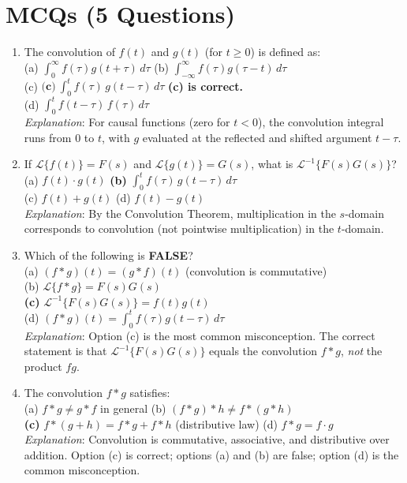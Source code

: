 \documentclass[12pt,a4paper]{article}
\begin{document}
\section{MCQs (5 Questions)}

\begin{enumerate}[label=\textbf{MCQ \arabic*.}, leftmargin=*, itemsep=12pt]

\item The convolution of $f(t)$ and $g(t)$ (for $t\ge 0$) is defined as:\\
(a) $\displaystyle\int_0^\infty f(\tau)g(t+\tau)\,d\tau$ \qquad
(b) $\displaystyle\int_{-\infty}^\infty f(\tau)g(\tau-t)\,d\tau$\\[4pt]
(c) $\textbf{(c)}\ \displaystyle\int_0^t f(\tau)\,g(t-\tau)\,d\tau$ \qquad
\textbf{(c) is correct.}\\
(d) $\displaystyle\int_0^t f(t-\tau)\,f(\tau)\,d\tau$ \\[2pt]
\textit{Explanation}: For causal functions (zero for $t<0$), the convolution integral runs from $0$ to $t$,
with $g$ evaluated at the reflected and shifted argument $t-\tau$.

\item If $\mathcal{L}\{f(t)\}=F(s)$ and $\mathcal{L}\{g(t)\}=G(s)$, what is $\mathcal{L}^{-1}\{F(s)G(s)\}$?\\
(a) $f(t)\cdot g(t)$ \qquad \textbf{(b)} $\displaystyle\int_0^t f(\tau)\,g(t-\tau)\,d\tau$ \\[4pt]
(c) $f(t)+g(t)$ \qquad (d) $f(t)-g(t)$ \\[2pt]
\textit{Explanation}: By the Convolution Theorem, multiplication in the $s$-domain corresponds to
convolution (not pointwise multiplication) in the $t$-domain.

\item Which of the following is \textbf{FALSE}?\\
(a) $(f*g)(t)=(g*f)(t)$ \quad (convolution is commutative)\\
(b) $\mathcal{L}\{f*g\}=F(s)G(s)$\\
\textbf{(c)} $\mathcal{L}^{-1}\{F(s)G(s)\}=f(t)g(t)$\\
(d) $(f*g)(t)=\int_0^t f(\tau)g(t-\tau)\,d\tau$ \\[2pt]
\textit{Explanation}: Option (c) is the most common misconception. The correct statement is that
$\mathcal{L}^{-1}\{F(s)G(s)\}$ equals the convolution $f*g$, \emph{not} the product $fg$.

\item The convolution $f*g$ satisfies: \\
(a) $f*g \ne g*f$ in general \qquad (b) $(f*g)*h \ne f*(g*h)$\\
\textbf{(c)} $f*(g+h)=f*g+f*h$ \quad (distributive law) \qquad (d) $f*g=f\cdot g$ \\[2pt]
\textit{Explanation}: Convolution is commutative, associative, and distributive over addition.
Option (c) is correct; options (a) and (b) are false; option (d) is the common misconception.


\end{enumerate}
\end{document}
